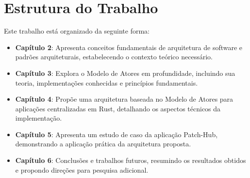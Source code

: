 \section{Estrutura do Trabalho}

Este trabalho está organizado da seguinte forma:

\begin{itemize}
    \item \textbf{Capítulo 2}: Apresenta conceitos fundamentais de arquitetura de software e padrões arquiteturais, estabelecendo o contexto teórico necessário.
    
    \item \textbf{Capítulo 3}: Explora o Modelo de Atores em profundidade, incluindo sua teoria, implementações conhecidas e princípios fundamentais.
    
    \item \textbf{Capítulo 4}: Propõe uma arquitetura baseada no Modelo de Atores para aplicações centralizadas em Rust, detalhando os aspectos técnicos da implementação.
    
    \item \textbf{Capítulo 5}: Apresenta um estudo de caso da aplicação Patch-Hub, demonstrando a aplicação prática da arquitetura proposta.
    
    \item \textbf{Capítulo 6}: Conclusões e trabalhos futuros, resumindo os resultados obtidos e propondo direções para pesquisa adicional.
\end{itemize}
